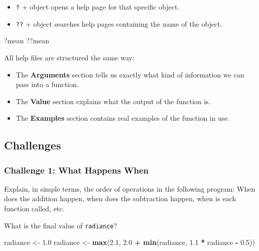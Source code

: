 \documentclass[
]{book}
\newenvironment{Shaded}{\begin{snugshade}}{\end{snugshade}}
\newcommand{\FloatTok}[1]{\textcolor[rgb]{0.00,0.00,0.81}{#1}}
\newcommand{\KeywordTok}[1]{\textcolor[rgb]{0.13,0.29,0.53}{\textbf{#1}}}
\newcommand{\NormalTok}[1]{#1}
\newcommand{\OperatorTok}[1]{\textcolor[rgb]{0.81,0.36,0.00}{\textbf{#1}}}
\newcommand{\StringTok}[1]{\textcolor[rgb]{0.31,0.60,0.02}{#1}}
\providecommand{\tightlist}{%
  \setlength{\itemsep}{0pt}\setlength{\parskip}{0pt}}
\begin{document}
\begin{itemize}
\tightlist
\item
  \texttt{?} + object opens a help page for that specific object.
\item
  \texttt{??} + object searches help pages containing the name of the object.
\end{itemize}

\begin{Shaded}
\begin{Highlighting}[]
\NormalTok{?mean}
\NormalTok{??mean}
\end{Highlighting}
\end{Shaded}

All help files are structured the same way:

\begin{itemize}
\tightlist
\item
  The \textbf{Arguments} section tells us exactly what kind of information we can pass into a function.
\item
  The \textbf{Value} section explains what the output of the function is.
\item
  The \textbf{Examples} section contains real examples of the function in use.
\end{itemize}

\hypertarget{challenges-2}{%
\subsection{Challenges}\label{challenges-2}}

\hypertarget{challenge-1-what-happens-when}{%
\subsubsection*{Challenge 1: What Happens When}\label{challenge-1-what-happens-when}}

Explain, in simple terms, the order of operations in the following program: When does the addition happen, when does the subtraction happen, when is each function called, etc.

What is the final value of \texttt{radiance}?

\begin{Shaded}
\begin{Highlighting}[]
\NormalTok{radiance <-}\StringTok{ }\FloatTok{1.0}
\NormalTok{radiance <-}\StringTok{ }\KeywordTok{max}\NormalTok{(}\FloatTok{2.1}\NormalTok{, }\FloatTok{2.0} \OperatorTok{+}\StringTok{ }\KeywordTok{min}\NormalTok{(radiance, }\FloatTok{1.1} \OperatorTok{*}\StringTok{ }\NormalTok{radiance }\OperatorTok{-}\StringTok{ }\FloatTok{0.5}\NormalTok{))}
\end{Highlighting}
\end{Shaded}
\end{document}
